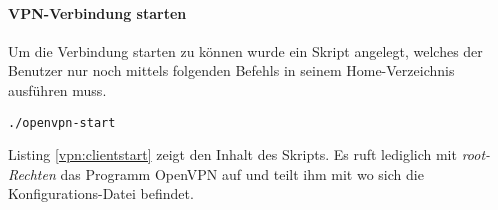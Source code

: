 \paragraph{VPN-Verbindung starten}

Um die Verbindung starten zu können wurde ein Skript angelegt, welches der Benutzer nur noch mittels folgenden Befehls in seinem Home-Verzeichnis ausführen muss.

\begin{lstlisting}
./openvpn-start
\end{lstlisting}



Listing \ref{vpn:clientstart} zeigt den Inhalt des Skripts. Es ruft lediglich mit \emph{root-Rechten} das Programm OpenVPN auf und teilt ihm mit wo sich die Konfigurations-Datei befindet.
